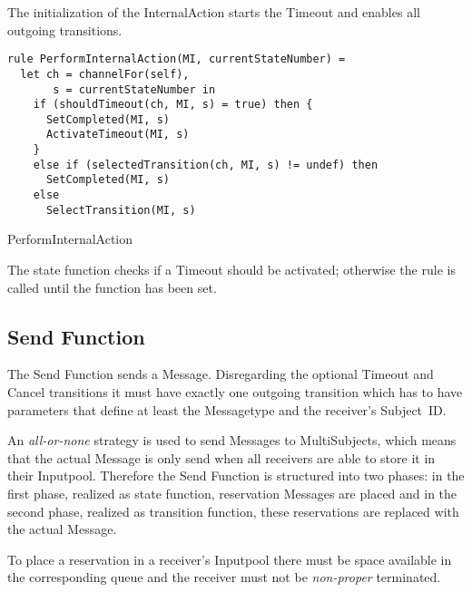 The initialization of the InternalAction starts the Timeout and enables all
outgoing transitions.


\begin{listing}[htbp]
\begin{verbatim}
rule PerformInternalAction(MI, currentStateNumber) =
  let ch = channelFor(self),
       s = currentStateNumber in
    if (shouldTimeout(ch, MI, s) = true) then {
      SetCompleted(MI, s)
      ActivateTimeout(MI, s)
    }
    else if (selectedTransition(ch, MI, s) != undef) then
      SetCompleted(MI, s)
    else
      SelectTransition(MI, s)
\end{verbatim}
\caption{PerformInternalAction}
\label{lst:shortasm:PerformInternalAction}
\end{listing}


The state function checks if a Timeout should be activated; otherwise the
 rule is called until the  function has
been set.




\subsection{Send Function}


The Send Function sends a Message. Disregarding the optional Timeout and Cancel
transitions it must have exactly one outgoing transition which has to have parameters that
define at least the Messagetype and the receiver's Subject~ID.

An \textit{all-or-none} strategy is used to send Messages to MultiSubjects,
which means that the actual Message is only send when all receivers are able
to store it in their Inputpool. Therefore the Send Function is structured into
two phases: in the first phase, realized as state function, reservation Messages
are placed and in the second phase, realized as transition function, these reservations
are replaced with the actual Message.

To place a reservation in a receiver's Inputpool there must be space available
in the corresponding queue and the receiver must not be
\textit{non-proper} terminated.


